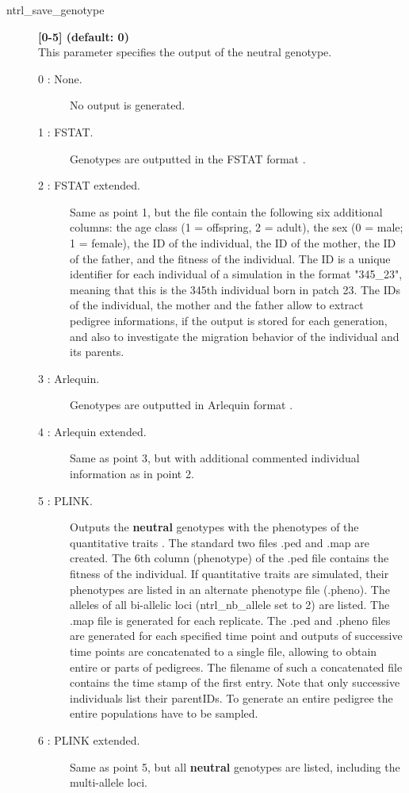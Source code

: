 \documentclass[letterpaper,12pt,oneside]{book}
\begin{document}
\begin{description} 
\item[ntrl\_save\_genotype] \textbf{[0-5] (default: 0)} \\
This parameter specifies the output of the neutral genotype.
\begin{description}
\item [0 : None.] No output is generated.
\item [1 : FSTAT.] Genotypes are outputted in the FSTAT format \citep{Goudet_1995}. 
\item [2 : FSTAT extended.] Same as point 1, but the file contain the following six additional columns: the age class (1 = offspring, 2 = adult), the sex (0 = male; 1 = female), the ID of the individual, the ID of the mother, the ID of the father, and the fitness of the individual. The ID is a unique identifier for each individual of a simulation in the format "345\_23", meaning that this is the 345th individual born in patch 23. The IDs of the individual, the mother and the father allow to extract pedigree informations, if the output is stored for each generation, and also to investigate the migration behavior of the individual and its parents. 
\item [3 : Arlequin.] Genotypes are outputted in Arlequin format \citep{Excoffier_2010}.
\item [4 : Arlequin extended.] Same as point 3, but with additional commented individual information as in point 2. 
\item [5 : PLINK.] Outputs the \textbf{neutral} genotypes with the phenotypes of the quantitative traits \citep{Purcell_2007}. The standard two files .ped and .map are created. The 6th column (phenotype) of the .ped file contains the fitness of the individual. If quantitative traits are simulated, their phenotypes are listed in an alternate phenotype file (.pheno). The alleles of all bi-allelic loci (\textsf{ntrl\_nb\_allele} set to 2) are listed. The .map file is generated for each replicate. The .ped and .pheno files are generated for each specified time point and outputs of successive time points are concatenated to a single file, allowing to obtain entire or parts of pedigrees. The filename of such a concatenated file contains the time stamp of the first entry. Note that only successive individuals list their parentIDs. To generate an entire pedigree the entire populations have to be sampled. 

\item [6 : PLINK extended.] Same as point 5, but all \textbf{neutral} genotypes are listed, including the multi-allele loci.
\end{description} 


\end{description}
\end{document}
